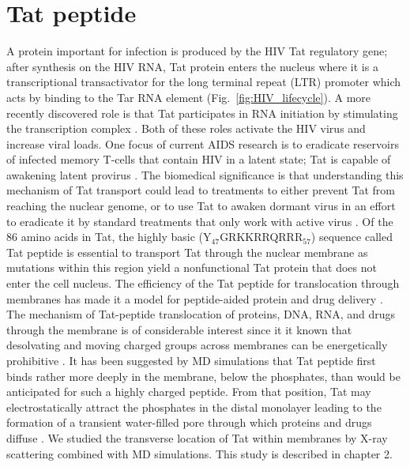 \section{Tat peptide}
A protein important for infection is produced by the HIV Tat regulatory gene;
after synthesis on the HIV RNA, Tat protein enters the nucleus where it is a
transcriptional transactivator for the long terminal repeat (LTR)
promoter which acts by binding to the Tar RNA element \cite{Vaishnav91}
(Fig.~\ref{fig:HIV_lifecycle}).
A more recently discovered role is that Tat participates in RNA
initiation by stimulating the transcription complex \cite{Raha05}.
Both of these roles activate the HIV virus and increase viral loads.
One focus of current AIDS research is to eradicate reservoirs of 
infected memory T-cells that contain HIV in a latent state;
Tat is capable of awakening latent provirus \cite{Macias09}.
The biomedical significance is that understanding this mechanism of 
Tat transport could lead to treatments to either prevent Tat from
reaching the nuclear genome, or to use Tat to awaken dormant virus
in an effort to eradicate it by standard treatments that only
work with active virus \cite{Macias09}. Of the 86 amino acids in Tat,
the highly basic (Y$_{47}$GRKKRRQRRR$_{57}$) sequence called Tat peptide 
is essential to transport
Tat through the nuclear membrane \cite{Ruben89,Hauber87} as mutations within
this region yield a nonfunctional Tat protein that does not enter the cell 
nucleus. The efficiency of the Tat peptide for translocation through
membranes has made it a model for peptide-aided protein and drug delivery
\cite{Futaki01}. The mechanism of Tat-peptide translocation of proteins, 
DNA, RNA, and drugs through the membrane is of considerable interest
since it it known that desolvating and moving charged groups across membranes
can be energetically prohibitive \cite{Grabe04}. 
It has been suggested by MD simulations that Tat peptide first binds rather
more deeply in the membrane, below the phosphates, than
would be anticipated for such a highly charged peptide. From that position,
Tat may electrostatically attract the phosphates in the distal monolayer
leading to the formation of a transient water-filled pore through which
proteins and drugs diffuse \cite{Herce07}. 
We studied the transverse location of Tat within membranes by X-ray scattering
combined with MD simulations. This study is described in chapter 2.

